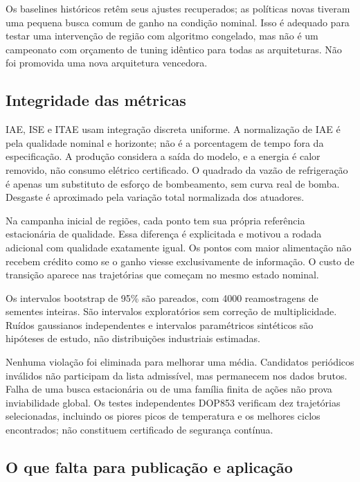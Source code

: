 \documentclass[
  11pt,
  letterpaper,
]{article}
\begin{document}
Os baselines históricos retêm seus ajustes recuperados; as políticas
novas tiveram uma pequena busca comum de ganho na condição nominal. Isso
é adequado para testar uma intervenção de região com algoritmo
congelado, mas não é um campeonato com orçamento de tuning idêntico para
todas as arquiteturas. Não foi promovida uma nova arquitetura vencedora.

\hypertarget{integridade-das-muxe9tricas}{%
\subsection{Integridade das
métricas}\label{integridade-das-muxe9tricas}}

IAE, ISE e ITAE usam integração discreta uniforme. A normalização de IAE
é pela qualidade nominal e horizonte; não é a porcentagem de tempo fora
da especificação. A produção considera a saída do modelo, e a energia é
calor removido, não consumo elétrico certificado. O quadrado da vazão de
refrigeração é apenas um substituto de esforço de bombeamento, sem curva
real de bomba. Desgaste é aproximado pela variação total normalizada dos
atuadores.

Na campanha inicial de regiões, cada ponto tem sua própria referência
estacionária de qualidade. Essa diferença é explicitada e motivou a
rodada adicional com qualidade exatamente igual. Os pontos com maior
alimentação não recebem crédito como se o ganho viesse exclusivamente de
informação. O custo de transição aparece nas trajetórias que começam no
mesmo estado nominal.

Os intervalos bootstrap de 95\% são pareados, com 4000 reamostragens de
sementes inteiras. São intervalos exploratórios sem correção de
multiplicidade. Ruídos gaussianos independentes e intervalos
paramétricos sintéticos são hipóteses de estudo, não distribuições
industriais estimadas.

Nenhuma violação foi eliminada para melhorar uma média. Candidatos
periódicos inválidos não participam da lista admissível, mas permanecem
nos dados brutos. Falha de uma busca estacionária ou de uma família
finita de ações não prova inviabilidade global. Os testes independentes
DOP853 verificam dez trajetórias selecionadas, incluindo os piores picos
de temperatura e os melhores ciclos encontrados; não constituem
certificado de segurança contínua.

\hypertarget{o-que-falta-para-publicauxe7uxe3o-e-aplicauxe7uxe3o}{%
\subsection{O que falta para publicação e
aplicação}\label{o-que-falta-para-publicauxe7uxe3o-e-aplicauxe7uxe3o}}
\end{document}
